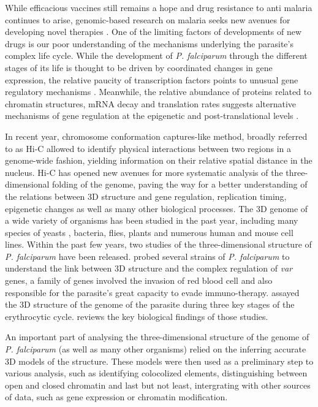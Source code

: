 \documentclass[letterpaper,12pt]{article}
\begin{document}
While efficacious vaccines still remains a hope and drug resistance to anti
malaria continues to arise, genomic-based research on malaria seeks new
avenues for developing novel therapies \citet{kirchner:recent}. One of the
limiting factors of developments of new drugs is our poor understanding of the
mechanisms underlying the parasite's complex life cycle. While the development
of {\em P. falciparum} through the different stages of its life is thought to
be driven by coordinated changes in gene expression, the relative paucity of
transcription factors points to unusual gene regulatory mechanisms . Meanwhile,
the relative abundance of proteins related to chromatin structures, mRNA decay
and translation rates suggests alternative mechanisms of gene regulation at the
epigenetic and post-translational levels
\citep{cui:chromatin-mediated, duffy:role, hoeijmakers:placing,
horrocks:control, deitsch:mechanisms}.

In recent year, chromosome conformation captures-like method, broadly referred
to as Hi-C allowed to identify physical interactions between two regions in a
genome-wide fashion, yielding information on their relative spatial distance
in the nucleus. Hi-C has opened new avenues for more systematic analysis of
the three-dimensional folding of the genome, paving the way for a better
understanding of the relations between 3D structure and gene regulation,
replication timing, epigenetic changes as well as many other biological
processes. The 3D genome of a wide variety of organisms has been studied in
the past year, including many species of yeasts \citet{duan:three-dimensional,
burton:xx}, bacteria, flies, plants and numerous human and mouse cell lines.
Within the past few years, two studies of the three-dimensional structure of
{\em P. falciparum} have been released.  \citet{lemieux:genome-wide} probed
several strains of {\em P. falciparum} to understand the link between 3D
structure and the complex regulation of \textit{var} genes, a family of genes
involved the invasion of red blood cell and also responsible for the
parasite's great capacity to evade immuno-therapy.
\citet{ay:three-dimensional} assayed the 3D structure of the genome of the
parasite during three key stages of the erythrocytic cycle.
\citet{ay:multiple} reviews the key biological findings of those studies.

An important part of analysing the three-dimensional structure of the
genome of {\em P. falciparum} (as well as many other organisms) relied on the
inferring accurate 3D models of the structure. These models were then used as
a preliminary step to various analysis, such as identifying colocolized
elements, distinguishing between open and closed chromatin and last but not
least, intergrating with other sources of data, such as gene expression or
chromatin modification. 
\end{document}
